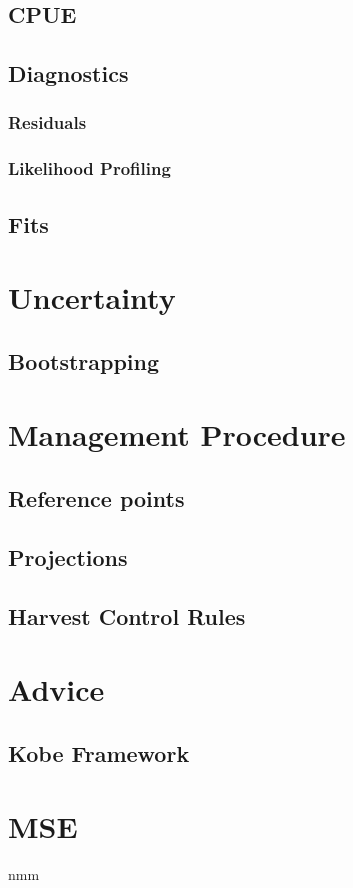 \documentclass[shortnames,nojss,article]{jss}
\begin{document}
\subsection{CPUE}

\subsection{Diagnostics}

\subsubsection{Residuals}
\subsubsection{Likelihood Profiling}

\subsection{Fits}

\section{Uncertainty}
\subsection{Bootstrapping}

\section{Management Procedure}
\subsection{Reference points}
\subsection{Projections}
\subsection{Harvest Control Rules}

\section{Advice}
\subsection{Kobe Framework}

\section{MSE}


nmm\\
\end{document}
